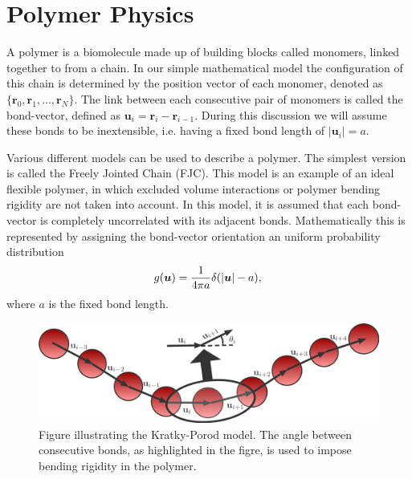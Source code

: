 \section{Polymer Physics}

A polymer is a biomolecule made up of building blocks called monomers, linked together to
from a chain. In our simple mathematical model the configuration of this chain is
determined by the position vector of each monomer, denoted as $\{\boldsymbol{r}_0,
    \boldsymbol{r}_1, \dots,
\boldsymbol{r}_N\}$.  The link between each consecutive pair of monomers is called the
bond-vector, defined as
$\boldsymbol{u}_i = \boldsymbol{r}_i - \boldsymbol{r}_{i-1}$. During this discussion we
will assume these bonds to be inextensible, i.e. having a fixed
bond length of $|\boldsymbol{u}_i| = a$.

Various different models can be used to describe a polymer. The simplest version is
called the Freely Jointed Chain (FJC). This model is an example of an ideal flexible
polymer, in which excluded volume interactions or polymer bending rigidity are not taken
into account.  In this model, it is assumed that each bond-vector is completely
uncorrelated with its adjacent bonds. Mathematically this is represented by assigning the
bond-vector orientation an uniform probability distribution
\begin{equation}
    g(\boldsymbol{u}) = \frac{1}{4 \pi a}
    \delta(|\boldsymbol{u}| - a), \\
\end{equation}
where $a$ is the fixed bond length.

\begin{figure}[h!]
    \centering
    \includegraphics[width=0.95\linewidth]{Figures/kratky.png}
    \vspace{0.3cm}
    \caption[Illustration of the Kratky-porod model.]{Figure illustrating the
        Kratky-Porod model. The angle between consecutive bonds, as highlighted in the
    figre, is used to impose bending rigidity in the polymer.}
    \label{fig:kratky}
\end{figure}

